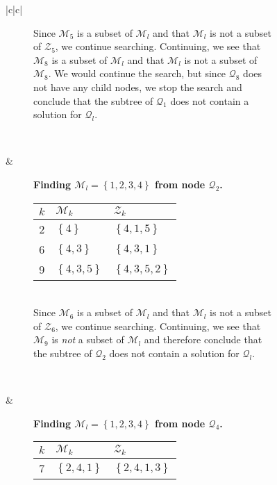\begin{figure}
\begin{tabular}{|c|c|}
\begin{subfigure}[b]{0.64\textwidth}
        Since $\mathcal{M}_5$ is a subset of $\mathcal{M}_l$ and that
        $\mathcal{M}_l$ is not a subset of $\mathcal{Z}_5$, we continue
        searching. Continuing, we see that $\mathcal{M}_8$ is a subset of
        $\mathcal{M}_l$ and that $\mathcal{M}_l$ is not a subset of
        $\mathcal{M}_8$. We would continue the search, but since
        $\mathcal{Q}_8$ does not have any child nodes, we stop the search
        and conclude that the subtree of $\mathcal{Q}_1$ does not contain
        a solution for $\mathcal{Q}_l$.
    \end{subfigure}
    \\ \hline
    \begin{subfigure}[b]{0.35\textwidth}
        \centering
        
    \end{subfigure}
    & 
    \begin{subfigure}[b]{0.64\textwidth}
        \textbf{Finding $\mathcal{M}_l = \left\{{1,2,3,4}\right\}$ from node $\mathcal{Q}_2$.} \\
        \begin{tabular}{rll}
            $k$ & $\mathcal{M}_k$            & $\mathcal{Z}_k$ \\ \hline
            2        & $\left\{{4}\right\}$       & $\left\{{4,1,5}\right\}$ \\ 
            6        & $\left\{{4,3}\right\}$     & $\left\{{4,3,1}\right\}$ \\ 
            9        & $\left\{{4,3,5}\right\}$   & $\left\{{4,3,5,2}\right\}$ \\ 
        \end{tabular}
        \\

        Since $\mathcal{M}_6$ is a subset of $\mathcal{M}_l$ and that
        $\mathcal{M}_l$ is not a subset of $\mathcal{Z}_6$, we continue
        searching. Continuing, we see that $\mathcal{M}_9$ is \emph{not} a
        subset of $\mathcal{M}_l$ and therefore conclude that the subtree of
        $\mathcal{Q}_2$ does not contain a solution for $\mathcal{Q}_l$.
        \\
    \end{subfigure}
    \\ \hline
    \begin{subfigure}[b]{0.35\textwidth}
        \centering
        
    \end{subfigure}
    & 
    \begin{subfigure}[b]{0.64\textwidth}
        \textbf{Finding $\mathcal{M}_l = \left\{{1,2,3,4}\right\}$ from node $\mathcal{Q}_4$.} \\
        \begin{tabular}{rll}
            $k$ & $\mathcal{M}_k$            & $\mathcal{Z}_k$ \\ \hline
            7        & $\left\{{2,4,1}\right\}$   & $\left\{{2,4,1,3}\right\}$ \\ 
        \end{tabular}
        \\


\end{subfigure}
\end{tabular}
\end{figure}
